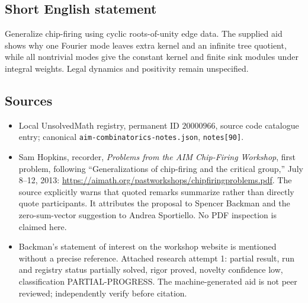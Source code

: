 \documentclass[11pt]{article}
\begin{document}
\subsection{Short English statement}
Generalize chip-firing using cyclic roots-of-unity edge data. The supplied aid shows why one Fourier mode leaves extra kernel and an infinite tree quotient, while all nontrivial modes give the constant kernel and finite sink modules under integral weights. Legal dynamics and positivity remain unspecified.
\subsection{Sources}
\begin{itemize}
\item Local UnsolvedMath registry, permanent ID $20000966$, source code catalogue entry; canonical \texttt{aim-combinatorics-notes.json}, \texttt{notes[90]}.
\item Sam Hopkins, recorder, \emph{Problems from the AIM Chip-Firing Workshop}, first problem, following ``Generalizations of chip-firing and the critical group,'' July 8--12, 2013: \url{https://aimath.org/pastworkshops/chipfiringproblems.pdf}. The source explicitly warns that quoted remarks summarize rather than directly quote participants. It attributes the proposal to Spencer Backman and the zero-sum-vector suggestion to Andrea Sportiello. No PDF inspection is claimed here.
\item Backman's statement of interest on the workshop website is mentioned without a precise reference. Attached research attempt 1: partial result, run and registry status partially solved, rigor proved, novelty confidence low, classification PARTIAL-PROGRESS. The machine-generated aid is not peer reviewed; independently verify before citation.
\end{itemize}
\end{document}
